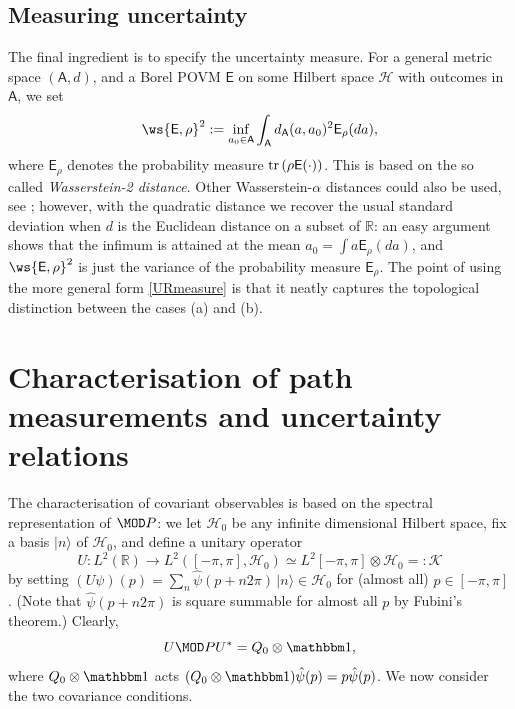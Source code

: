 \subsection{Measuring uncertainty}

The final ingredient is to specify the uncertainty measure. For a general metric space $(\mathsf A,d)$, and a Borel POVM $\mathsf E$ on some Hilbert space $\mathcal H$ with outcomes in $\mathsf A$, we set
\begin{align}
\ws{\mathsf E,\rho}^2:=\inf_{a_0\in \mathsf A} \int_{\mathsf A} d_{\mathsf A}(a,a_0)^2 \mathsf E_\rho(da),\label{URmeasure}
\end{align}
where $\mathsf E_\rho$ denotes the probability measure $\operatorname{tr}\left( \rho \mathsf E(\cdot) \right)$.
This is based on the so called \emph{Wasserstein-2 distance}. Other Wasserstein-$\alpha$ distances could also be used, see \cite{BLW}; however, with the quadratic distance we recover the usual standard deviation when $d$ is the Euclidean distance on a subset of $\mathbb R$: an easy argument shows that the infimum is attained at the mean $a_0=\int a \mathsf E_\rho(da)$, and $\ws{\mathsf E,\rho}^2$ is just the variance of the probability measure $\mathsf E_\rho$. The point of using the more general form \eqref{URmeasure} is that it neatly captures the topological distinction between the cases (a) and (b).


\section{Characterisation of path measurements and uncertainty relations}
The characterisation of covariant observables is based on the spectral representation of $\MOD P$: we let $\mathcal H_0$ be any infinite dimensional Hilbert space, fix a basis $|n\rangle$ of $\mathcal H_0$, and define a unitary operator
$$U:L^2(\mathbb R) \to L^2([-\pi,\pi],\mathcal H_0)\simeq L^2[-\pi,\pi]\otimes \mathcal H_0=:\mathcal K$$
by setting $(U\psi)(p) = \sum_{n} \hat\psi(p+n2\pi) \,|n\rangle\in \mathcal H_0$ for (almost all) $p\in [-\pi,\pi]$. (Note that $\hat\psi(p+n2\pi)$ is square summable for almost all $p$ by Fubini's theorem.) Clearly,
$$
U\MOD P U^* = Q_0\otimes \id,
$$
where $Q_0\otimes \id$ acts $(Q_0\otimes \id)\hat\psi(p) = p\hat\psi(p)$. We now consider the two covariance conditions.

